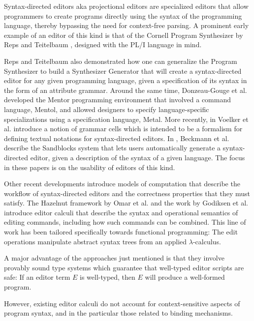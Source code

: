 \documentclass[sigplan,screen]{acmart}
\begin{document}
Syntax-directed editors aka projectional editors are specialized
editors that allow programmers to create programs directly using the
syntax of the programming language, thereby bypassing the need for
context-free parsing. A prominent early example of an editor of this
kind is that of the Cornell Program Synthesizer by Reps and Teitelbaum
\cite{10.1145/358746.358755}, designed with the PL/I language in mind.

Reps and Teitelbaum also demonstrated \cite{10.1145/390010.808247} how
one can generalize the Program Synthesizer to build a Synthesizer
Generator that will create a syntax-directed editor for any given
programming language, given a specification of its syntax in the form
of an attribute grammar. Around the same time, Donzeau-Gouge et
al. developed the Mentor programming environment
\cite{10.5555/800054.801990} that involved a command language, Mentol,
and allowed designers to specify language-specific specializations
using a specification language, Metal. More recently, in
\cite{10.1145/2997364.2997365} Voelker et al. introduce a notion of
grammar cells which is intended to be a formalism for defining textual
notations for syntax-directed editors. In
\cite{10.1145/3544548.3580785}, Beckmann et al. describe the
Sandblocks system that lets users automatically generate a
syntax-directed editor, given a description of the syntax of a given
language. The focus in these papers is on the usability of editors of
this kind.

Other recent developments introduce models of computation that
describe the workflow of syntax-directed editors and the correctness
properties that they must satisfy. The Hazelnut framework by Omar et
al. \cite{hazelnut} and the work by Godiksen et al. 
\cite{type_safe_structure_editor} introduce editor calculi that
describe the syntax and operational semantics of editing commands,
including how such commands can be combined. This line of work has
been tailored specifically towards functional programming: The edit
operations manipulate abstract syntax trees from an applied
$\lambda$-calculus.

A major advantage of the approaches just mentioned is that they
involve provably sound type systems which guarantee that well-typed
editor scripts are safe: If an editor term $E$ is well-typed, then $E$
will produce a well-formed program.

However, existing editor calculi do not account for context-sensitive
aspects of program syntax, and in the particular those related to
binding mechanisms.
\end{document}
